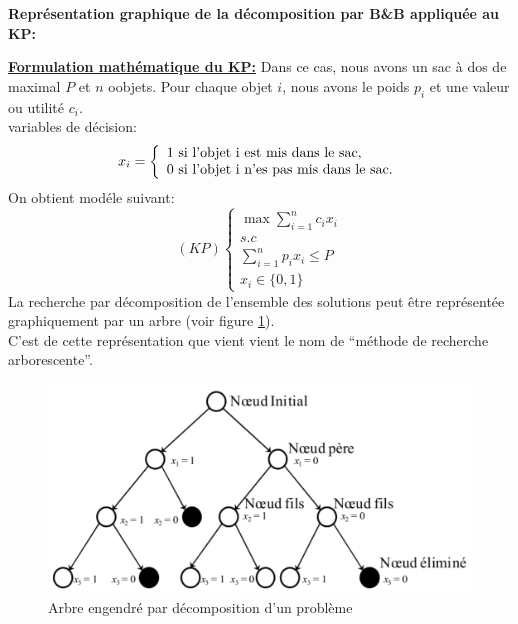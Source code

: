 \documentclass[a4paper,11pt,oneside]{report}
\theoremstyle{plain}
\newcommand{\0}{/ \! \! \! 0}
\theoremstyle{plain}
\begin{document}
 \begin{cursive} 
  {\bf Repr\'esentation graphique de la d\'ecomposition par B\&B appliqu\'ee au KP:}
 \end{cursive}
\underline{\bfseries Formulation math\'ematique du KP:} Dans ce cas, nous avons un sac \`a dos de maximal $P$ et $n$ oobjets. Pour chaque objet $i$, nous avons le poids $p_i$
 et une valeur ou utilit\'e $c_i$.\\
 variables de d\'ecision:
 $$
   x_i = \left \{ \begin{array}{l}
           1 \,\, \textnormal{si l'objet i est mis dans le sac,}\\
           0 \,\, \textnormal{si l'objet i n'es pas mis dans le sac.}
          \end{array}
          \right.
 $$
 On obtient mod\'ele suivant:
 \[
  (KP) \left \{\begin{array}{l}
          \max \displaystyle\sum_{i=1}^n c_i x_i \\
          s.c                        \\
          \displaystyle\sum_{i=1}^n p_i x_i \leq P \\
          x_i \in \{ 0, 1 \}
         \end{array}\right.
 \]
 La recherche par d\'ecomposition de l'ensemble des solutions peut \^etre repr\'esent\'ee graphiquement par un arbre (voir figure \ref{fig1}).\\
 C'est de cette repr\'esentation que vient vient le nom de ``m\'ethode de recherche arborescente''.
  \begin{figure}[h!]
  \begin{center}
  \includegraphics[scale=0.6]{fig1}
  \caption{\label{fig1} Arbre engendr\'e par d\'ecomposition d'un probl\`eme}
  \end{center}
  \end{figure}
\end{document}
